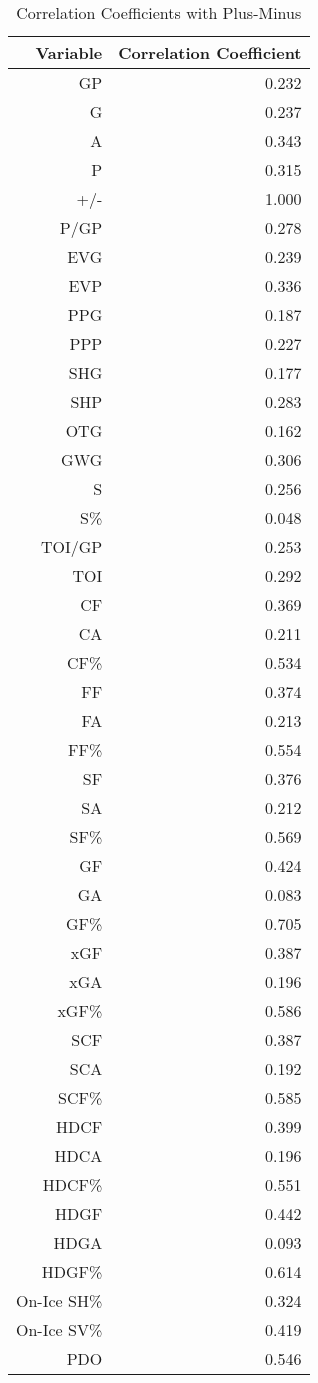 \documentclass[12pt]{article}
\begin{document}
\begin{table}[tbp]
  \caption{Correlation Coefficients with Plus-Minus}
  \label{tab:rv}
\centering
\small
\begin{tabular}{rr}
  \toprule
Variable & Correlation Coefficient \\ 
  \midrule
  GP & 0.232 \\ 
  G & 0.237 \\ 
  A & 0.343 \\ 
  P & 0.315 \\ 
  +/- & 1.000 \\ 
  P/GP & 0.278 \\ 
  EVG & 0.239 \\ 
  EVP & 0.336 \\ 
  PPG & 0.187 \\ 
  PPP & 0.227 \\ 
  SHG & 0.177 \\ 
  SHP & 0.283 \\ 
  OTG & 0.162 \\ 
  GWG & 0.306 \\ 
  S & 0.256 \\ 
  S\% & 0.048 \\ 
  TOI/GP & 0.253 \\ 
  TOI & 0.292 \\ 
  CF & 0.369 \\ 
  CA & 0.211 \\ 
  CF\% & 0.534 \\ 
  FF & 0.374 \\ 
  FA & 0.213 \\ 
  FF\% & 0.554 \\ 
  SF & 0.376 \\ 
  SA & 0.212 \\ 
  SF\% & 0.569 \\ 
  GF & 0.424 \\ 
  GA & 0.083 \\ 
  GF\% & 0.705 \\ 
  xGF & 0.387 \\ 
  xGA & 0.196 \\ 
  xGF\% & 0.586 \\ 
  SCF & 0.387 \\ 
  SCA & 0.192 \\ 
  SCF\% & 0.585 \\ 
  HDCF & 0.399 \\ 
  HDCA & 0.196 \\ 
  HDCF\% & 0.551 \\ 
  HDGF & 0.442 \\ 
  HDGA & 0.093 \\ 
  HDGF\% & 0.614 \\ 
  On-Ice SH\% & 0.324 \\ 
  On-Ice SV\% & 0.419 \\ 
  PDO & 0.546 \\ 
  \bottomrule
\end{tabular}
\end{table}
\end{document}
